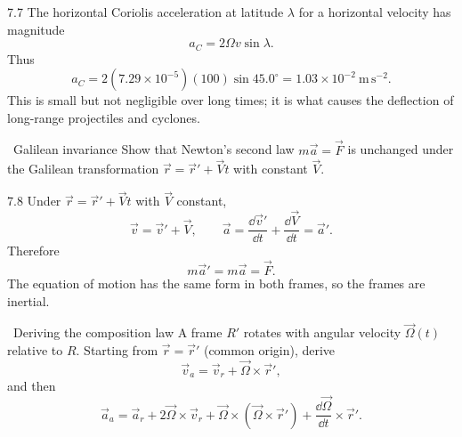 \begin{tabletworkspace}[6.5cm]
\end{tabletworkspace}

\begin{solution}{7.7}
The horizontal Coriolis acceleration at latitude $\lambda$ for a horizontal
velocity has magnitude
\[
a_C=2\Omega v\sin\lambda.
\]
Thus
\[
a_C=2(7.29\times10^{-5})(100)\sin45.0^\circ
=1.03\times10^{-2}\ \mathrm{m\,s^{-2}}.
\]
This is small but not negligible over long times; it is what causes the
deflection of long-range projectiles and cyclones.
\end{solution}

\begin{exercise}{\core\ Galilean invariance}
Show that Newton's second law $m\vec a=\vec F$ is unchanged under the Galilean
transformation $\vec r=\vec r'+\vec Vt$ with constant $\vec V$.
\end{exercise}

\begin{tabletworkspace}[6.5cm]
\end{tabletworkspace}

\begin{solution}{7.8}
Under $\vec r=\vec r'+\vec Vt$ with $\vec V$ constant,
\[
\vec v=\vec v'+\vec V,\qquad
\vec a=\frac{\dd\vec v'}{\dd t}+\frac{\dd\vec V}{\dd t}=\vec a'.
\]
Therefore
\[
m\vec a'=m\vec a=\vec F.
\]
The equation of motion has the same form in both frames, so the frames are
inertial.
\end{solution}

\begin{exercise}{\mastery\ Deriving the composition law}
A frame $R'$ rotates with angular velocity $\vec\Omega(t)$ relative to $R$.
Starting from $\vec r=\vec r'$ (common origin), derive
\[
\vec v_a=\vec v_r+\vec\Omega\times\vec r',
\]
and then
\[
\vec a_a=\vec a_r+2\vec\Omega\times\vec v_r
+\vec\Omega\times(\vec\Omega\times\vec r')
+\frac{\dd\vec\Omega}{\dd t}\times\vec r'.
\]
\end{exercise}

\begin{tabletworkspace}[6.5cm]
\end{tabletworkspace}

